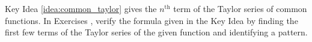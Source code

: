 {\noindent Key Idea \ref{idea:common_taylor} gives the $n^\text{th}$ term of the Taylor series of common functions. In Exercises}
{, verify the formula given in the Key Idea by finding the first few terms of the Taylor series of the given function and identifying a pattern.
}
